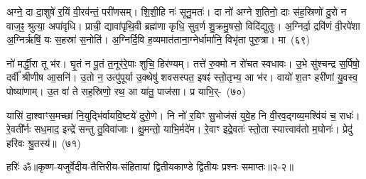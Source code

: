 अग्ने॒ दा दा॒शुषे॑ र॒यिं वी॒रव॑न्तं॒ परी॑णसम्। शि॒शी॒हि नः॑ सूनु॒मतः॑। दा नो॑ अग्ने श॒तिनो॒ दाः स॑ह॒स्रिणो॑ दु॒रो न वाज॒ꣴ॒ श्रुत्या॒ अपा॑वृधि। प्राची॒ द्यावा॑\-पृथि॒वी ब्रह्म॑णा कृधि॒ सुव॒र्ण शु॒क्रमु॒षसो॒ विदि॑द्युतुः। अ॒ग्निर्दा॒ द्रवि॑णं वी॒रपे॑शा अ॒ग्निर्\mbox{}ऋषिं॒ यः स॒हस्रा॑ स॒नोति॑। अ॒ग्निर्दि॒वि ह॒व्यमात॑ताना॒ग्नेर्धामा॑नि॒ विभृ॑ता पुरु॒त्रा। मा~(६९)

नो॑ मर्द्धी॒रा तू भ॑र। घृ॒तं न पू॒तं त॒नूर॑रे॒पाः शुचि॒ हिर॑ण्यम्। तत्ते॑ रु॒क्मो न रो॑चत स्वधावः। उ॒भे सु॑श्चन्द्र स॒र्पिषो॒ दर्वी᳚ श्रीणीष आ॒सनि॑। उ॒तो न॒ उत्पु॑पूर्या उ॒क्थेषु॑ शवसस्पत॒ इषꣴ॑ स्तो॒तृभ्य॒ आ भ॑र। वायो॑ श॒तꣳ हरी॑णां यु॒वस्व॒ पोष्या॑णाम्। उ॒त वा॑ ते सह॒स्रिणो॒ रथ॒ आ या॑तु॒ पाज॑सा। प्र याभि॒र्-~(७०)

यासि॑ दा॒श्वाꣳस॒मच्छा॑ नि॒युद्भि॑र्वायवि॒ष्टये॑ दुरो॒णे। नि नो॑ र॒यिꣳ सु॒भोज॑सं युवे॒ह नि वी॒रव॒द्गव्य॒मश्वि॑यं च॒ राधः॑। रे॒वती᳚र्नः सध॒माद॒ इन्द्रे॑ सन्तु तु॒विवा॑जाः। क्षु॒मन्तो॒ याभि॒र्मदे॑म। रे॒वाꣳ इद्रे॒वतः॑ स्तो॒ता स्यात्त्वाव॑तो म॒घोनः॑। प्रेदु॑ हरिवः श्रु॒तस्य॑॥~(७१)

{\anuvakamend[जि॒नोषि॑ देभुः॒ प्र ह॒व्यं ब॒भूथ॒ मा याभि॑श्चत्वारि॒ꣳ॒शच्च॑]}

{हरिः॑ ॐ}{॥कृष्ण-यजुर्वेदीय-तैत्तिरीय-संहितायां द्वितीयकाण्डे द्वितीयः प्रश्नः समाप्तः॥२-२॥}
